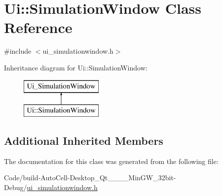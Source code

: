 \hypertarget{class_ui_1_1_simulation_window}{}\section{Ui\+:\+:Simulation\+Window Class Reference}
\label{class_ui_1_1_simulation_window}


{\ttfamily \#include $<$ui\+\_\+simulationwindow.\+h$>$}

Inheritance diagram for Ui\+:\+:Simulation\+Window\+:\begin{figure}[H]
\begin{center}
\leavevmode
\includegraphics[height=2.000000cm]{class_ui_1_1_simulation_window}
\end{center}
\end{figure}
\subsection*{Additional Inherited Members}


The documentation for this class was generated from the following file\+:\begin{DoxyCompactItemize}
\item 
Code/build-\/\+Auto\+Cell-\/\+Desktop\+\_\+\+Qt\+\_\+\_\+\_\+\_\+\+Min\+G\+W\+\_\+32bit-\/\+Debug/\mbox{\hyperlink{ui__simulationwindow_8h}{ui\+\_\+simulationwindow.\+h}}\end{DoxyCompactItemize}
